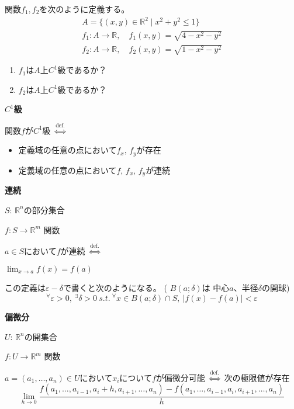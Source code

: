 \documentclass[12pt,b5paper]{ltjsarticle}
\begin{document}
関数$f_1,f_2$を次のように定義する。
\begin{gather}
 A = \{ (x,y) \in \mathbb{R}^2 \mid x^2+y^2\leq 1\}\\
 f_1 : A \rightarrow \mathbb{R}, \quad f_{1}(x,y)=\sqrt{4-x^2-y^2}\\
 f_2 : A \rightarrow \mathbb{R}, \quad f_{2}(x,y)=\sqrt{1-x^2-y^2}
\end{gather}
\begin{enumerate}
 \item $f_1$は$A$上$C^1$級であるか？
 \item $f_2$は$A$上$C^1$級であるか？
\end{enumerate}

\hrulefill

\textbf{$C^1$級}

関数$f$が$C^1$級
$\stackrel{\mathrm{def.}}{\Leftrightarrow}$
\begin{itemize}
 \item 定義域の任意の点において$f_x, \, f_y$が存在
 \item 定義域の任意の点において$f, \, f_x, \, f_y$が連続
\end{itemize}

\dotfill

\textbf{連続}

$S$: $\mathbb{R}^n$の部分集合

$f : S \rightarrow \mathbb{R}^m$ 関数

$a\in S$において$f$が連続
$\stackrel{\mathrm{def.}}{\Leftrightarrow}$

$\lim_{x\rightarrow a}f(x) = f(a)$

この定義は$\varepsilon - \delta$で書くと次のようになる。
( $B(a;\delta)$は 中心$a$、半径$\delta$の開球)
\begin{equation}
 {}^{\forall} \varepsilon >0 , \ {}^{\exists}\delta >0
  \ s.t. \
  {}^{\forall} x\in B(a;\delta) \cap S ,\ \lvert f(x)-f(a) \rvert < \varepsilon
\end{equation}

\dotfill

\textbf{偏微分}

$U$: $\mathbb{R}^n$の開集合

$f : U \rightarrow \mathbb{R}^m$ 関数

$a=(a_1,\dots,a_n)\in U$において$x_i$について$f$が偏微分可能
$\stackrel{\mathrm{def.}}{\Leftrightarrow}$
次の極限値が存在
\begin{equation}
 \lim_{h\rightarrow 0}\frac{f(a_1,\dots,a_{i-1},a_{i}+h,a_{i+1},\dots,a_n)-f(a_1,\dots,a_{i-1},a_{i},a_{i+1},\dots,a_n)}{h}
\end{equation}
\end{document}
